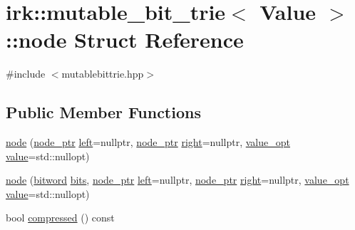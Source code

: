 \hypertarget{structirk_1_1mutable__bit__trie_1_1node}{}\section{irk\+:\+:mutable\+\_\+bit\+\_\+trie$<$ Value $>$\+:\+:node Struct Reference}
\label{structirk_1_1mutable__bit__trie_1_1node}


{\ttfamily \#include $<$mutablebittrie.\+hpp$>$}

\subsection*{Public Member Functions}
\begin{DoxyCompactItemize}
\item 
\mbox{\hyperlink{structirk_1_1mutable__bit__trie_1_1node_a74037ab76023b8ff9c1cd88f91d06684}{node}} (\mbox{\hyperlink{classirk_1_1mutable__bit__trie_abd23179ac4f02a981d4f47b4c0652287}{node\+\_\+ptr}} \mbox{\hyperlink{structirk_1_1mutable__bit__trie_1_1node_af59565476fb0ce3e3e3d57edbd8ca1de}{left}}=nullptr, \mbox{\hyperlink{classirk_1_1mutable__bit__trie_abd23179ac4f02a981d4f47b4c0652287}{node\+\_\+ptr}} \mbox{\hyperlink{structirk_1_1mutable__bit__trie_1_1node_ad75512c087c6adaf342b9c62fd115f55}{right}}=nullptr, \mbox{\hyperlink{classirk_1_1mutable__bit__trie_a7a1b77766d10fe2d02bb2ce01983f153}{value\+\_\+opt}} \mbox{\hyperlink{structirk_1_1mutable__bit__trie_1_1node_a1bacc998d6276431578e9ecb8f3dfa59}{value}}=std\+::nullopt)
\item 
\mbox{\hyperlink{structirk_1_1mutable__bit__trie_1_1node_a8b89d07cbc5be62f39eb3995659812b2}{node}} (\mbox{\hyperlink{namespaceirk_a5d1a67079cf6423ecaededebe848f083}{bitword}} \mbox{\hyperlink{structirk_1_1mutable__bit__trie_1_1node_a8b55d968fa4274a91a6395ea1b9785a8}{bits}}, \mbox{\hyperlink{classirk_1_1mutable__bit__trie_abd23179ac4f02a981d4f47b4c0652287}{node\+\_\+ptr}} \mbox{\hyperlink{structirk_1_1mutable__bit__trie_1_1node_af59565476fb0ce3e3e3d57edbd8ca1de}{left}}=nullptr, \mbox{\hyperlink{classirk_1_1mutable__bit__trie_abd23179ac4f02a981d4f47b4c0652287}{node\+\_\+ptr}} \mbox{\hyperlink{structirk_1_1mutable__bit__trie_1_1node_ad75512c087c6adaf342b9c62fd115f55}{right}}=nullptr, \mbox{\hyperlink{classirk_1_1mutable__bit__trie_a7a1b77766d10fe2d02bb2ce01983f153}{value\+\_\+opt}} \mbox{\hyperlink{structirk_1_1mutable__bit__trie_1_1node_a1bacc998d6276431578e9ecb8f3dfa59}{value}}=std\+::nullopt)
\item 
bool \mbox{\hyperlink{structirk_1_1mutable__bit__trie_1_1node_a3b28e6bf24b4500b5b9fd7d3c1bb48e0}{compressed}} () const
\end{DoxyCompactItemize}
